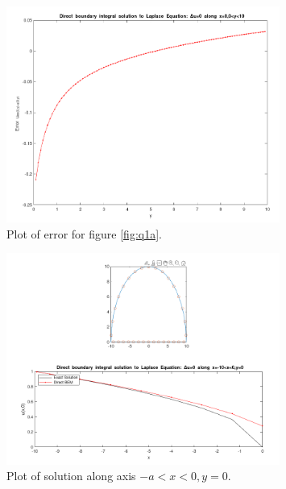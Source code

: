 \documentclass[letterpaper, reqno,11pt]{article}
\begin{document}
\begin{figure}[htpb]
   \centering
   \includegraphics[width=0.8\textwidth]{q1b}
   \caption{Plot of error for figure \ref{fig:q1a}.}
   \label{fig:q1b}
\end{figure}

\begin{figure}[htpb]
   \centering
   \includegraphics[width=0.8\textwidth]{q1c}
   \caption{Plot of solution along axis $-a<x<0,y=0$.}
   \label{fig:q1c}
\end{figure}
\end{document}
